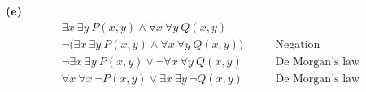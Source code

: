 \documentclass[12pt, letterpaper, twoside]{article}
\begin{document}
\noindent \textbf{(e)}
\begin{align*}
 \exists x\ \exists y\ P(x, y) \land \forall x\ \forall y\ Q(x, y)\\
 \neg{(}\exists x\ \exists y\ P(x, y) \land \forall x\ \forall y\ Q(x, y)) &\qquad \text{Negation}\\
 \neg{\exists} x\ \exists y\ P(x, y) \lor \neg{\forall} x\ \forall y\ Q(x, y) &\qquad \text{De Morgan's law}\\
 \forall x\ \forall x\ \neg{P}(x, y) \lor \exists x\ \exists y\ \neg{Q}(x, y) &\qquad \text{De Morgan's law}\\
\end{align*}
\end{document}
